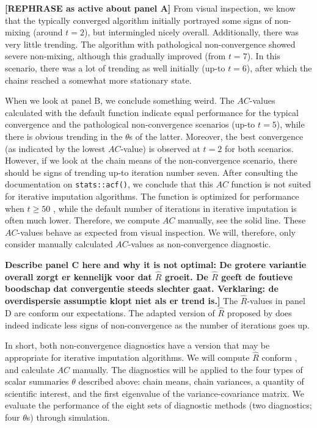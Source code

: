 \documentclass[Royal,times,sageh]{sagej}
\begin{document}
\textbf{{[}REPHRASE as active about panel A{]}} From visual inspection, we know that the typically converged algorithm initially portrayed some signs of non-mixing (around \(t=2\)), but intermingled nicely overall. Additionally, there was very little trending. The algorithm with pathological non-convergence showed severe non-mixing, although this gradually improved (from \(t=7\)). In this scenario, there was a lot of trending as well initially (up-to \(t=6\)), after which the chains reached a somewhat more stationary state.

When we look at panel B, we conclude something weird. The \(AC\)-values calculated with the default function indicate equal performance for the typical convergence and the pathological non-convergence scenarios (up-to \(t=5\)), while there is obvious trending in the \(\theta\)s of the latter. Moreover, the best convergence (as indicated by the lowest \(AC\)-value) is observed at \(t=2\) for both scenarios. However, if we look at the chain means of the non-convergence scenario, there should be signs of trending up-to iteration number seven. After consulting the documentation on \texttt{stats::acf()}, we conclude that this \(AC\) function is not suited for iterative imputation algorithms. The function is optimized for performance when \(t\geq50\) \citep{box15}, while the default number of iterations in iterative imputation is often much lower. Therefore, we compute \(AC\) manually, see the solid line. These \(AC\)-values behave as expected from visual inspection. We will, therefore, only consider manually calculated \(AC\)-values as non-convergence diagnostic.

\textbf{Describe panel C here and why it is not optimal: De grotere variantie overall zorgt er kennelijk voor dat \(\widehat{R}\) groeit. De \(\widehat{R}\) geeft de foutieve boodschap dat convergentie steeds slechter gaat. Verklaring: de overdispersie assumptie klopt niet als er trend is.{]}} The \(\widehat{R}\)-values in panel D are conform our expectations. The adapted version of \(\widehat{R}\) proposed by \citet{veht19} does indeed indicate less signs of non-convergence as the number of iterations goes up. \textbf{\citep[explain the dip in Rhat values at t=2. Namely, because we can only use 2 of the 3 tricks by][ if the number of iterations is very low (t\textless4). That's why the \(\widehat{R}\)s are more similar to the traditional GR.]{veht19}} \newline

\noindent In short, both non-convergence diagnostics have a version that may be appropriate for iterative imputation algorithms. We will compute \(\widehat{R}\) conform \citet{veht19}, and calculate \(AC\) manually. The diagnostics will be applied to the four types of scalar summaries \(\theta\) described above: chain means, chain variances, a quantity of scientific interest, and the first eigenvalue of the variance-covariance matrix. We evaluate the performance of the eight sets of diagnostic methods (two diagnostics; four \(\theta\)s) through simulation.
\end{document}
